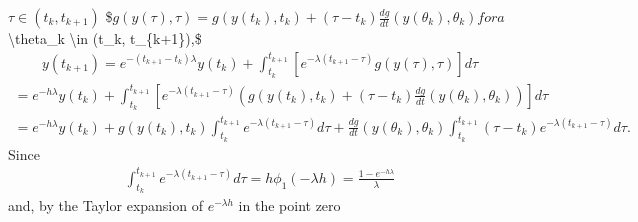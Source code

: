 \documentclass[letterpaper,10pt,english]{jupyterBook}
\begin{document}
\sphinxAtStartPar
\(\tau \in (t_k, t_{k+1})\)
\$\(
    g(y(\tau), \tau) = g(y(t_k), t_k) + (\tau - t_k) \frac{dg}{dt} (y(\theta_k), \theta_k)
\)\(
for a \)\textbackslash{}theta\_k \textbackslash{}in (t\_k, t\_\{k+1\}),\$
\begin{equation*}
\begin{split}
    y(t_{k+1}) = e^{-(t_{k+1}-t_k) \lambda}y(t_k) + \int_{t_k}^{t_{k+1}} [e^{-\lambda(t_{k+1}-\tau)} g(y(\tau), \tau)] d\tau
\end{split}
\end{equation*}\begin{equation*}
\begin{split}
    = e^{-h \lambda}y(t_k) + \int_{t_k}^{t_{k+1}} \left[e^{-\lambda(t_{k+1}-\tau)} \left( g(y(t_k), t_k) + (\tau - t_k) \frac{dg}{dt} (y(\theta_k), \theta_k)\right)\right] d\tau
\end{split}
\end{equation*}\begin{equation*}
\begin{split}
    = e^{-h \lambda}y(t_k) + g(y(t_k), t_k) \int_{t_k}^{t_{k+1}} e^{-\lambda(t_{k+1}-\tau)} d\tau + \frac{dg}{dt} (y(\theta_k), \theta_k) \int_{t_k}^{t_{k+1}} (\tau - t_k) e^{-\lambda(t_{k+1}-\tau)} d\tau.
\end{split}
\end{equation*}
\sphinxAtStartPar
Since
\begin{equation*}
\begin{split}
    \int_{t_k}^{t_{k+1}} e^{-\lambda(t_{k+1}-\tau)} d\tau = h\phi_1(-\lambda h)= \frac{1-e^{-h \lambda}}{\lambda}
\end{split}
\end{equation*}
\sphinxAtStartPar
and, by the Taylor expansion of \(e^{-\lambda h}\) in the point zero
\end{document}
